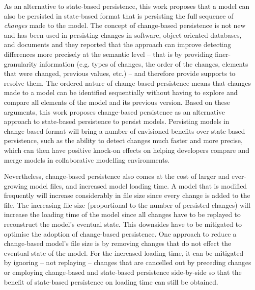 \documentclass[12pt, a4paper]{report} \usepackage[titletoc]{appendix}
\begin{document}
As an alternative to state-based persistence, this work proposes that a model can also be persisted in state-based format that is persisting the full sequence of \emph{changes} made to the model. The concept of change-based persistence is not new and has been used in persisting changes in software, object-oriented databases, and documents \cite{mens2002state,DBLP:conf/sde/LippeO92,DBLP:conf/caise/IgnatN05} and they reported that the approach can improve detecting differences more precisely at the semantic level -- that is by providing finer-granularity information (e.g. types of changes, the order of the changes, elements that were changed, previous values, etc.) -- and therefore provide supports to resolve them. The ordered nature of change-based persistence means that changes made to a model can be identified sequentially without having to explore and compare all elements of the model and its previous version. Based on these arguments, this work proposes change-based persistence as an alternative approach to state-based persistence to persist models. Persisting models in change-based format will bring a number of envisioned benefits over state-based persistence, such as the ability to detect changes much faster and more precise, which can then have positive knock-on effects on helping developers compare and merge models in collaborative modelling environments. 

Nevertheless, change-based persistence also comes at the cost of larger and ever-growing model files, and increased model loading time. A model that is modified frequently will increase considerably in file size since every change is added to the file. The increasing file size (proportional to the number of persisted changes) will increase the loading time of the model since all changes have to be replayed to reconstruct the model's eventual state. This downsides have to be mitigated to optimise the adoption of change-based persistence. One approach to reduce a change-based model's file size is by removing changes that do not effect the eventual state of the model. For the increased loading time, it can be mitigated by ignoring -- not replaying -- changes that are cancelled out by preceding changes or employing change-based and state-based persistence side-by-side so that the benefit of state-based persistence on loading time can still be obtained.   
\end{document}
